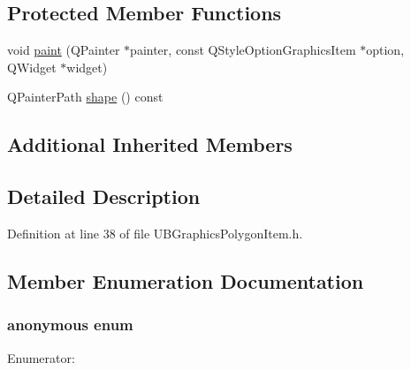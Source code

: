 \subsection*{Protected Member Functions}
\begin{DoxyCompactItemize}
\item 
void \hyperlink{class_u_b_graphics_polygon_item_ae721fea33eb806623854483bc5c0ffa3}{paint} (Q\-Painter $\ast$painter, const Q\-Style\-Option\-Graphics\-Item $\ast$option, Q\-Widget $\ast$widget)
\item 
Q\-Painter\-Path \hyperlink{class_u_b_graphics_polygon_item_a8688ceb70c29f83d41aef0f5c407def2}{shape} () const 
\end{DoxyCompactItemize}
\subsection*{Additional Inherited Members}


\subsection{Detailed Description}


Definition at line 38 of file U\-B\-Graphics\-Polygon\-Item.\-h.



\subsection{Member Enumeration Documentation}
\hypertarget{class_u_b_graphics_polygon_item_a1acd33a55453d233c333a6d6e8896e5d}{\subsubsection[{anonymous enum}]{\setlength{\rightskip}{0pt plus 5cm}anonymous enum}}\label{d5/d46/class_u_b_graphics_polygon_item_a1acd33a55453d233c333a6d6e8896e5d}
\begin{Desc}
\item[Enumerator\-: ]\par
\begin{description}
\item[{\em 
\hypertarget{class_u_b_graphics_polygon_item_a1acd33a55453d233c333a6d6e8896e5da15789bea86a37e6d6c688472abc48a54}{Type}\label{d5/d46/class_u_b_graphics_polygon_item_a1acd33a55453d233c333a6d6e8896e5da15789bea86a37e6d6c688472abc48a54}
}]\end{description}
\end{Desc}



